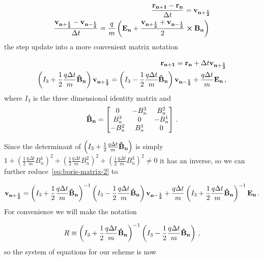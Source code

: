 \documentclass[12pt, class=report, crop=false]{standalone}
\begin{document}
\begin{subequations}
  \begin{align}
    \frac{\vb{r_{n+1}} - \vb{r_n}}{\Delta t} = \vb{v_{n+\frac{1}{2}}}\\
    \frac{\vb{v_{n+\frac{1}{2}}} - \vb{v_{n-\frac{1}{2}}} }{\Delta t} = \frac{q}{m} \left(\vb{E_n} + \frac{\vb{v_{n+\frac{1}{2}}} + \vb{v_{n-\frac{1}{2}}}}{2} \cp \vb{B_n} \right)\,
  \end{align}
\end{subequations}
the step update into a more convenient matrix notation

\begin{subequations}
  \begin{align}
    \vb{r_{n+1}} = \vb{r_n} + \Delta t \vb{v_{n+\frac{1}{2}}}\\
    \label{eq:boris-matrix-2}
    \left( I_3 + \frac{1}{2}\frac{q\Delta t}{m} \vb{\hat{B}_n} \right) \vb{v_{n+\frac{1}{2}}} = \left( I_3 - \frac{1}{2}\frac{q\Delta t}{m} \vb{\hat{B}_n} \right) \vb{v_{n-\frac{1}{2}}} + \frac{q\Delta t}{m} \vb{E_n}\,,
  \end{align}
\end{subequations}
where \(I_3\) is the three dimensional identity matrix and
\[
\vb{\hat{B}_n} = \begin{bmatrix}
  0 & -B_n^3 & B_n^2\\
  B_n^3 & 0 & -B_n^1\\
  -B_n^2 & B_n^1 & 0
\end{bmatrix}\,.
\]

Since the determinant of \(\left( I_3 + \frac{1}{2}\frac{q\Delta t}{m} \vb{\hat{B}_n} \right)\) is simply \(1+\left(\frac{1}{2}\frac{q\Delta t}{m} B_n^1\right)^2 + \left(\frac{1}{2}\frac{q\Delta t}{m} B_n^2\right)^2+ \left(\frac{1}{2}\frac{q\Delta t}{m} B_n^3\right)^2 \neq 0\) it has an inverse, so we can further reduce~\cref{eq:boris-matrix-2} to

\begin{equation}
  \vb{v_{n+\frac{1}{2}}} =\left( I_3 + \frac{1}{2}\frac{q\Delta t}{m} \vb{\hat{B}_n} \right)^{-1} \left( I_3 - \frac{1}{2}\frac{q\Delta t}{m} \vb{\hat{B}_n} \right) \vb{v_{n-\frac{1}{2}}} + \frac{q\Delta t}{m} \left( I_3 + \frac{1}{2}\frac{q\Delta t}{m} \vb{\hat{B}_n} \right)^{-1} \vb{E_n}\,.
\end{equation}
For convenience we will make the notation

\begin{equation}
  R \equiv \left( I_3 + \frac{1}{2}\frac{q\Delta t}{m} \vb{\hat{B}_n} \right)^{-1} \left( I_3 - \frac{1}{2}\frac{q\Delta t}{m} \vb{\hat{B}_n} \right)\,,
\end{equation}
so the system of equations for our scheme is now
\end{document}
